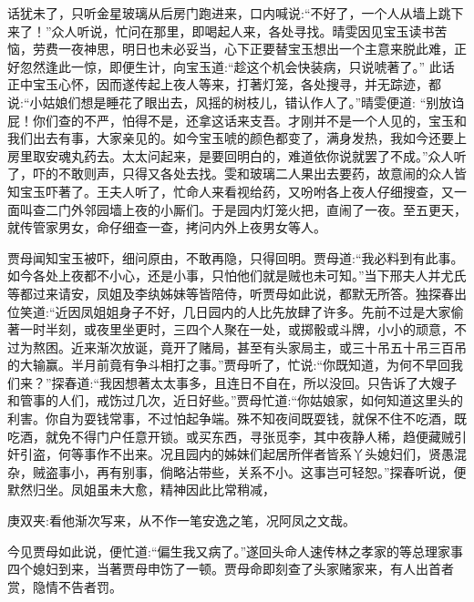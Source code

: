 \begin{parag}
    话犹未了，只听金星玻璃从后房门跑进来，口内喊说:“不好了，一个人从墙上跳下来了！”众人听说，忙问在那里，即喝起人来，各处寻找。晴雯因见宝玉读书苦恼，劳费一夜神思，明日也未必妥当，心下正要替宝玉想出一个主意来脱此难，正好忽然逢此一惊，即便生计，向宝玉道:“趁这个机会快装病，只说唬著了。” 此话正中宝玉心怀，因而遂传起上夜人等来，打著灯笼，各处搜寻，并无踪迹，都说:“小姑娘们想是睡花了眼出去，风摇的树枝儿，错认作人了。”晴雯便道: “别放诌屁！你们查的不严，怕得不是，还拿这话来支吾。才刚并不是一个人见的，宝玉和我们出去有事，大家亲见的。如今宝玉唬的颜色都变了，满身发热，我如今还要上房里取安魂丸药去。太太问起来，是要回明白的，难道依你说就罢了不成。”众人听了，吓的不敢则声，只得又各处去找。雯和玻璃二人果出去要药，故意闹的众人皆知宝玉吓著了。王夫人听了，忙命人来看视给药，又吩咐各上夜人仔细搜查，又一面叫查二门外邻园墙上夜的小厮们。于是园内灯笼火把，直闹了一夜。至五更天，就传管家男女，命仔细查一查，拷问内外上夜男女等人。
\end{parag}


\begin{parag}
    贾母闻知宝玉被吓，细问原由，不敢再隐，只得回明。贾母道:“我必料到有此事。如今各处上夜都不小心，还是小事，只怕他们就是贼也未可知。”当下邢夫人并尤氏等都过来请安，凤姐及李纨姊妹等皆陪侍，听贾母如此说，都默无所答。独探春出位笑道:“近因凤姐姐身子不好，几日园内的人比先放肆了许多。先前不过是大家偷著一时半刻，或夜里坐更时，三四个人聚在一处，或掷骰或斗牌，小小的顽意，不过为熬困。近来渐次放诞，竟开了赌局，甚至有头家局主，或三十吊五十吊三百吊的大输赢。半月前竟有争斗相打之事。”贾母听了，忙说:“你既知道，为何不早回我们来？”探春道:“我因想著太太事多，且连日不自在，所以没回。只告诉了大嫂子和管事的人们，戒饬过几次，近日好些。”贾母忙道:“你姑娘家，如何知道这里头的利害。你自为耍钱常事，不过怕起争端。殊不知夜间既耍钱，就保不住不吃酒，既吃酒，就免不得门户任意开锁。或买东西，寻张觅李，其中夜静人稀，趋便藏贼引奸引盗，何等事作不出来。况且园内的姊妹们起居所伴者皆系丫头媳妇们，贤愚混杂，贼盗事小，再有别事，倘略沾带些，关系不小。这事岂可轻恕。”探春听说，便默然归坐。凤姐虽未大愈，精神因此比常稍减，\begin{note}庚双夹:看他渐次写来，从不作一笔安逸之笔，况阿凤之文哉。\end{note}今见贾母如此说，便忙道:“偏生我又病了。”遂回头命人速传林之孝家的等总理家事四个媳妇到来，当著贾母申饬了一顿。贾母命即刻查了头家赌家来，有人出首者赏，隐情不告者罚。
\end{parag}


